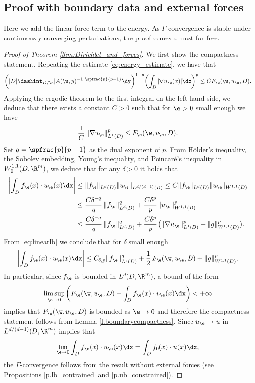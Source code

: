 \subsection{Proof with boundary data and external forces}\label{s.bd+forces}
Here we add the linear force term to the energy. As $\Gamma$-convergence is stable under continuously converging perturbations, the proof comes almost for free.
\begin{proof}[Proof of Theorem \ref{thm:Dirichlet_and_forces}]
We first show the compactness statement. Repeating the estimate \eqref{eq:energy_estimate}, we have that
\begin{equation*}
\biggl(|D|\dashint_{D/\e}|A(\w,y)^{-1}|^{\spfrac{p}{p-1}}\dy\biggr)^{1-p}\biggl(\int_{D}|\nabla u_{\e}(x)|\dx\biggr)^p\leq C F_{\e}(\w,u_{\e},D).
\end{equation*}
Applying the ergodic theorem to the first integral on the left-hand side, we deduce that there exists a constant $C>0$ such that for $\e>0$ small enough we have
\begin{equation}\label{eq:linearlb}
\frac{1}{C}\,\|\nabla u_{\e}\|_{L^1(D)}^p\leq F_{\e}(\w,u_{\e},D).
\end{equation}
Set $q=\spfrac{p}{p-1}$ as the dual exponent of $p$. From Hölder's inequality, the Sobolev embedding, Young's inequality, and Poincaré's inequality in $W^{1,1}_0(D,\R^m)$, we deduce that for any $\delta>0$ it holds that
\begin{align*}
\left|\int_D f_{\e}(x)\cdot u_{\e}(x)\dx\right|&\leq \|f_{\e}\|_{L^{d}(D)}\|u_{\e}\|_{L^{d/(d-1)}(D)}\leq C \|f_{\e}\|_{L^d(D)}\|u_{\e}\|_{W^{1,1}(D)}
\\
&\leq \frac{C\delta^{-q}}{ q}\,\|f_{\e}\|^{q}_{L^d(D)}+\frac{C\delta^p}{p}\,\|u_{\e}\|^p_{W^{1,1}(D)}
\\
&\leq \frac{C\delta^{-q}}{q}\,\|f_{\e}\|^q_{L^d(D)}+\frac{C\delta^p}{p}\,\bigl(\|\nabla u_{\e}\|^p_{L^1(D)}+\|g\|^p_{W^{1,1}(D)}\bigr).
\end{align*}
From \eqref{eq:linearlb} we conclude that for $\delta$ small enough
\begin{equation*}
\left|\int_D f_{\e}(x)\cdot u_{\e}(x)\dx\right|\leq C_{\delta,p}\|f_{\e}\|_{L^d(D)}^q+\frac{1}{2}\,F_{\e}(\w,u_{\e},D)+\|g\|_{W^{1,1}(D)}^p.
\end{equation*}
In particular, since $f_{\e}$ is bounded in $L^d(D,\R^m)$, a bound of the form
\begin{equation*}
\limsup_{\e\to 0} \left(F_{\e}(\w,u_{\e},D)-\int_D f_{\e}(x)\cdot u_{\e}(x)\dx\right)<+\infty
\end{equation*}
implies that $F_{\e}(\w,u_{\e},D)$ is bounded as $\e\to 0$ and therefore the compactness statement follows from Lemma \ref{l.boundarycompactness}. Since $u_{\e}\to u$ in $L^{d/(d-1)}(D,\R^m)$ implies that
\begin{equation*}
\lim_{\e\to 0}\int_D f_{\e}(x)\cdot u_{\e}(x)\dx=\int_D f_0(x)\cdot u(x)\dx,
\end{equation*}
the $\Gamma$-convergence follows from the result without external forces (see Propositions \ref{p.lb_contrained} and \ref{p.ub_constrained}).
\end{proof}


